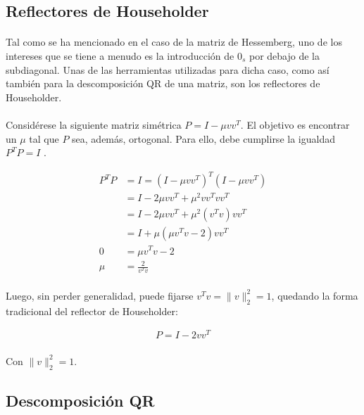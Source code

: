 \documentclass[12pt, twocolumn]{article}
\begin{document}
	\subsection{Reflectores de Householder}
	
	\paragraph{} Tal como se ha mencionado en el caso de la matriz de Hessemberg, uno de los intereses que se tiene a menudo es la introducción de $0_{s}$ por debajo de la subdiagonal. Unas de las herramientas utilizadas para dicha caso, como así también para la descomposición QR de una matriz, son los reflectores de Householder.
	
	\paragraph{} Considérese la siguiente matriz simétrica $P = I - \mu vv^{T}$. El objetivo es encontrar un $\mu$ tal que $P$ sea, además, ortogonal. Para ello, debe cumplirse la igualdad $P^{T}P = I$ \cite{l9}.
	
	
	\begin{align}
		P^{T}P &= I = (I - \mu vv^{T})^{T}(I - \mu vv^{T}) \\
		 &= I - 2\mu vv^{T} + \mu^{2}vv^{T}vv^{T} \\
		 &= I - 2\mu vv^{T} + \mu^{2}(v^{T}v)vv^{T} \\
		 &= I + \mu(\mu v^{T}v - 2)vv^{T} \\
		0 &= \mu v^{T}v - 2 \\
		\mu &= \frac{2}{v^{T}v}
	\end{align}
	
	\paragraph{} Luego, sin perder generalidad, puede fijarse $v^{T}v = \lVert v \rVert _{2}^{2} = 1$, quedando la forma tradicional del reflector de Householder:
	
	\begin{align}
		P = I - 2vv^{T}
	\end{align}
	\paragraph{}Con $\lVert v \rVert _{2}^{2} = 1$.
	
	\subsection{Descomposición QR}
	
\end{document}
